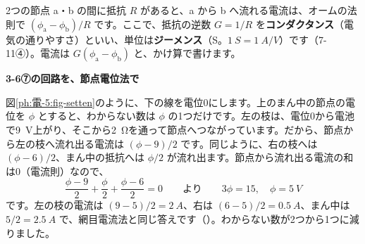 2つの節点 a・b の間に抵抗 $R$ があると、a から b へ流れる電流は、オームの法則で $(\phi_{\mathrm a}-\phi_{\mathrm b})/R$ です。ここで、抵抗の逆数 $G=1/R$ を\textbf{コンダクタンス}（電気の通りやすさ）といい、単位は\textbf{ジーメンス}（S。$\qty{1}{S}=\qty{1}{A/V}$）です（7-11④）。電流は $G(\phi_{\mathrm a}-\phi_{\mathrm b})$ と、かけ算で書けます。

\noindent\textbf{3-6⑦の回路を、節点電位法で}\par\nobreak
図\ref{ph:電-5:fig-setten}のように、下の線を電位0にします。上のまん中の節点の電位を $\phi$ とすると、わからない数は $\phi$ の1つだけです。左の枝は、電位0から電池で\qty{9}{V}上がり、そこから\qty{2}{\ohm}を通って節点へつながっています。だから、節点から左の枝へ流れ出る電流は $(\phi-9)/2$ です。同じように、右の枝へは $(\phi-6)/2$、まん中の抵抗へは $\phi/2$ が流れ出ます。節点から流れ出る電流の和は0（電流則）なので、
\[ \frac{\phi-9}{2}+\frac{\phi}{2}+\frac{\phi-6}{2}=0\qquad\text{より}\qquad 3\phi=15,\quad \phi=\qty{5}{V} \]
です。左の枝の電流は $(9-5)/2=\qty{2}{A}$、右は $(6-5)/2=\qty{0.5}{A}$、まん中は $5/2=\qty{2.5}{A}$ で、網目電流法と同じ答えです（）。わからない数が2つから1つに減りました。

\begin{bkfigure}
\label{ph:電-5:fig-setten}
\end{bkfigure}

